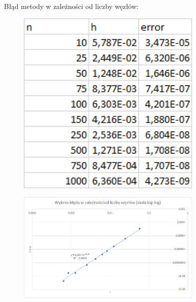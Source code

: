 \newpage

\begin{samepage}
    Błąd metody w zależności od liczby węzłów:
    \begin{figure}[!ht]
        \begin{center}
            \includegraphics[width=0.8\textwidth]{Lab4/charts/zad2/error_dane.png}
        \end{center}
    \end{figure}
    \FloatBarrier
\end{samepage} 

\begin{samepage}
    
    \begin{figure}[!ht]
        \begin{center}
            \includegraphics[width=0.8\textwidth]{Lab4/charts/zad2/error.png}
        \end{center}
    \end{figure}
    \FloatBarrier
\end{samepage}   


